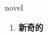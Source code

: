 
\begin{frame}
{\huge novel}
\begin{center}
\begin{enumerate}\Large
  \item \textbf{新奇的}
\end{enumerate}
\end{center}
\end{frame}
